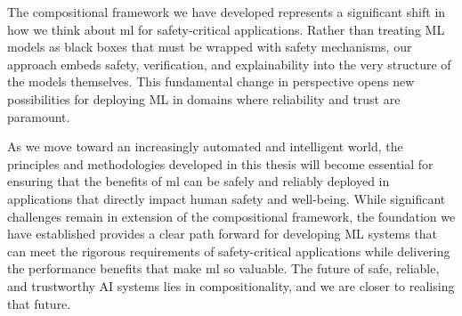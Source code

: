 The compositional framework we have developed represents a significant shift in how we think about \gls{ml} for safety-critical applications. Rather than treating ML models as black boxes that must be wrapped with safety mechanisms, our approach embeds safety, verification, and explainability into the very structure of the models themselves. This fundamental change in perspective opens new possibilities for deploying ML in domains where reliability and trust are paramount.

As we move toward an increasingly automated and intelligent world, the principles and methodologies developed in this thesis will become essential for ensuring that the benefits of \gls{ml} can be safely and reliably deployed in applications that directly impact human safety and well-being. While significant challenges remain in extension of the compositional framework, the foundation we have established provides a clear path forward for developing ML systems that can meet the rigorous requirements of safety-critical applications while delivering the performance benefits that make \gls{ml} so valuable. The future of safe, reliable, and trustworthy AI systems lies in compositionality, and we are closer to realising that future.